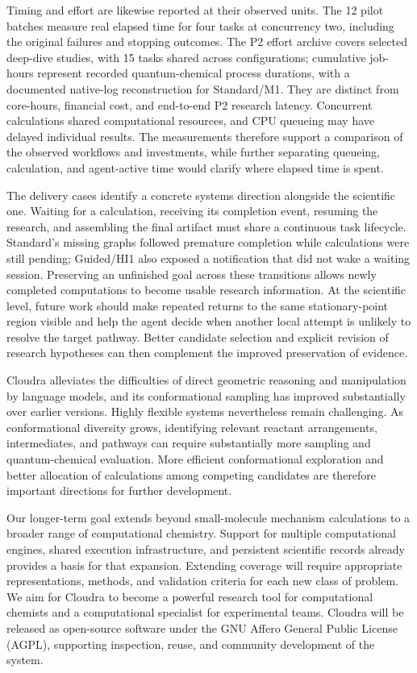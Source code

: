Timing and effort are likewise reported at their observed units. The 12 pilot batches measure real elapsed time for four tasks at concurrency two, including the original failures and stopping outcomes. The P2 effort archive covers selected deep-dive studies, with 15 tasks shared across configurations; cumulative job-hours represent recorded quantum-chemical process durations, with a documented native-log reconstruction for Standard/M1. They are distinct from core-hours, financial cost, and end-to-end P2 research latency. Concurrent calculations shared computational resources, and CPU queueing may have delayed individual results. The measurements therefore support a comparison of the observed workflows and investments, while further separating queueing, calculation, and agent-active time would clarify where elapsed time is spent.

The delivery cases identify a concrete systems direction alongside the scientific one. Waiting for a calculation, receiving its completion event, resuming the research, and assembling the final artifact must share a continuous task lifecycle. Standard's missing graphs followed premature completion while calculations were still pending; Guided/HI1 also exposed a notification that did not wake a waiting session. Preserving an unfinished goal across these transitions allows newly completed computations to become usable research information. At the scientific level, future work should make repeated returns to the same stationary-point region visible and help the agent decide when another local attempt is unlikely to resolve the target pathway. Better candidate selection and explicit revision of research hypotheses can then complement the improved preservation of evidence.

Cloudra alleviates the difficulties of direct geometric reasoning and manipulation by language models, and its conformational sampling has improved substantially over earlier versions. Highly flexible systems nevertheless remain challenging. As conformational diversity grows, identifying relevant reactant arrangements, intermediates, and pathways can require substantially more sampling and quantum-chemical evaluation. More efficient conformational exploration and better allocation of calculations among competing candidates are therefore important directions for further development.

Our longer-term goal extends beyond small-molecule mechanism calculations to a broader range of computational chemistry. Support for multiple computational engines, shared execution infrastructure, and persistent scientific records already provides a basis for that expansion. Extending coverage will require appropriate representations, methods, and validation criteria for each new class of problem. We aim for Cloudra to become a powerful research tool for computational chemists and a computational specialist for experimental teams. Cloudra will be released as open-source software under the GNU Affero General Public License (AGPL), supporting inspection, reuse, and community development of the system.
